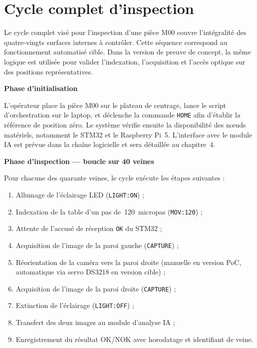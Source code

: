 \section{Cycle complet d'inspection}
\label{sec:cycle_inspection}

Le cycle complet visé pour l'inspection d'une pièce M00 couvre l'intégralité des
quatre-vingts surfaces internes à contrôler. Cette séquence correspond au fonctionnement
automatisé cible. Dans la version de preuve de concept, la même logique est utilisée pour
valider l'indexation, l'acquisition et l'accès optique sur des positions représentatives.

\medskip
\noindent\textbf{Phase d'initialisation}

L'opérateur place la pièce M00 sur le plateau de centrage, lance le script d'orchestration
sur le laptop, et déclenche la commande \texttt{HOME} afin d'établir la référence de position
zéro. Le système vérifie ensuite la disponibilité des nœuds matériels, notamment le STM32 et
le Raspberry Pi~5. L'interface avec le module IA est prévue dans la chaîne logicielle et sera
détaillée au chapitre~4.

\medskip
\noindent\textbf{Phase d'inspection — boucle sur 40 veines}

Pour chacune des quarante veines, le cycle exécute les étapes suivantes :
\begin{enumerate}
\item Allumage de l'éclairage LED (\texttt{LIGHT:ON}) ;
\item Indexation de la table d'un pas de~120~micropas (\texttt{MOV:120}) ;
\item Attente de l'accusé de réception \texttt{OK} du STM32 ;
\item Acquisition de l'image de la paroi gauche (\texttt{CAPTURE}) ;
\item Réorientation de la caméra vers la paroi droite (manuelle en version PoC,
      automatique via servo DS3218 en version cible) ;
\item Acquisition de l'image de la paroi droite (\texttt{CAPTURE}) ;
\item Extinction de l'éclairage (\texttt{LIGHT:OFF}) ;
\item Transfert des deux images au module d'analyse IA ;
\item Enregistrement du résultat OK/NOK avec horodatage et identifiant de veine.
\end{enumerate}

